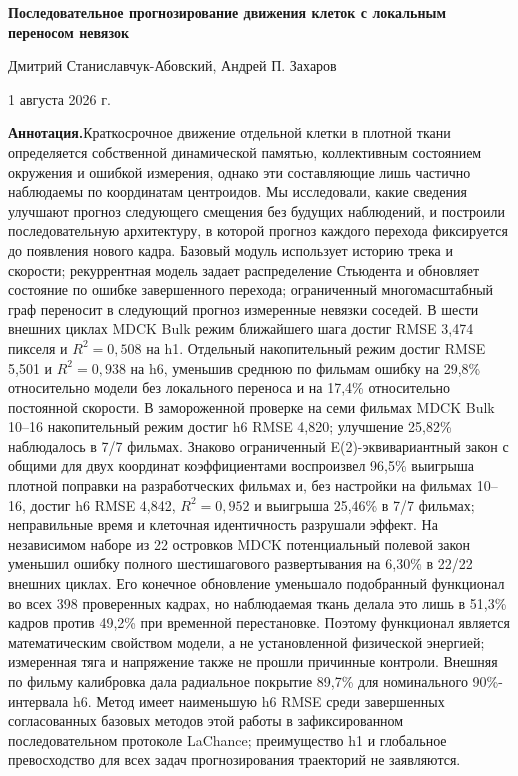\documentclass[11pt,a4paper]{article}
\begin{document}
\begin{center}
{\LARGE\bfseries Последовательное прогнозирование движения клеток с локальным переносом невязок\par}
\vspace{5mm}
{\normalsize Дмитрий Станиславчук-Абовский, Андрей П. Захаров\par}
\vspace{2mm}
{\small 1 августа 2026 г.\par}
\end{center}
\vspace{4mm}

\noindent\textbf{Аннотация.}\enspace Краткосрочное движение отдельной клетки в плотной ткани определяется собственной динамической памятью, коллективным состоянием окружения и ошибкой измерения, однако эти составляющие лишь частично наблюдаемы по координатам центроидов. Мы исследовали, какие сведения улучшают прогноз следующего смещения без будущих наблюдений, и построили последовательную архитектуру, в которой прогноз каждого перехода фиксируется до появления нового кадра. Базовый модуль использует историю трека и скорости; рекуррентная модель задает распределение Стьюдента и обновляет состояние по ошибке завершенного перехода; ограниченный многомасштабный граф переносит в следующий прогноз измеренные невязки соседей. В шести внешних циклах MDCK Bulk режим ближайшего шага достиг RMSE 3,474 пикселя и $R^2=0{,}508$ на h1. Отдельный накопительный режим достиг RMSE 5,501 и $R^2=0{,}938$ на h6, уменьшив среднюю по фильмам ошибку на 29,8\% относительно модели без локального переноса и на 17,4\% относительно постоянной скорости. В замороженной проверке на семи фильмах MDCK Bulk 10--16 накопительный режим достиг h6 RMSE 4,820; улучшение 25,82\% наблюдалось в 7/7 фильмах. Знаково ограниченный E(2)-эквивариантный закон с общими для двух координат коэффициентами воспроизвел 96,5\% выигрыша плотной поправки на разработческих фильмах и, без настройки на фильмах 10--16, достиг h6 RMSE 4,842, $R^2=0{,}952$ и выигрыша 25,46\% в 7/7 фильмах; неправильные время и клеточная идентичность разрушали эффект. На независимом наборе из 22 островков MDCK потенциальный полевой закон уменьшил ошибку полного шестишагового развертывания на 6,30\% в 22/22 внешних циклах. Его конечное обновление уменьшало подобранный функционал во всех 398 проверенных кадрах, но наблюдаемая ткань делала это лишь в 51,3\% кадров против 49,2\% при временной перестановке. Поэтому функционал является математическим свойством модели, а не установленной физической энергией; измеренная тяга и напряжение также не прошли причинные контроли. Внешняя по фильму калибровка дала радиальное покрытие 89,7\% для номинального 90\%-интервала h6. Метод имеет наименьшую h6 RMSE среди завершенных согласованных базовых методов этой работы в зафиксированном последовательном протоколе LaChance; преимущество h1 и глобальное превосходство для всех задач прогнозирования траекторий не заявляются.
\end{document}
